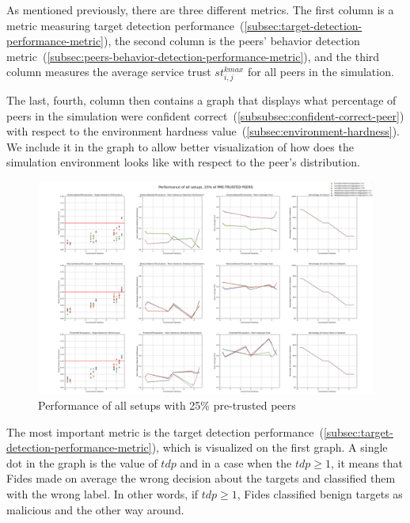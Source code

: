 As mentioned previously, there are three different metrics.
The first column is a metric measuring target detection performance~(\ref{subsec:target-detection-performance-metric}), the second column is the peers' behavior detection metric~(\ref{subsec:peers-behavior-detection-performance-metric}), and the third column measures the average service trust $st^{kmax}_{i, j}$ for all peers in the simulation.

The last, fourth, column then contains a graph that displays what percentage of peers in the simulation were confident correct~(\ref{subsubsec:confident-correct-peer}) with respect to the environment hardness value~(\ref{subsec:environment-hardness}).
We include it in the graph to allow better visualization of how does the simulation environment looks like with respect to the peer's distribution.

\begin{figure}[hp!]
    \centering
    \includegraphics[width=0.94\paperwidth, angle=90]{assets/25_all_metrics.png}
    \caption{Performance of all setups with 25\% pre-trusted peers}
    \label{fig:performance-all-setups-25-pretrusted}
\end{figure}

The most important metric is the target detection performance~(\ref{subsec:target-detection-performance-metric}), which is visualized on the first graph.
A single dot in the graph is the value of $tdp$ and in a case when the $tdp \geq 1$, it means that Fides made on average the wrong decision about the targets and classified them with the wrong label.
In other words, if $tdp \geq 1$, Fides classified benign targets as malicious and the other way around.

